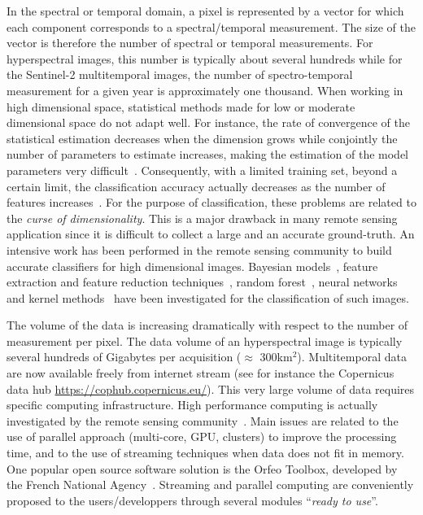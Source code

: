 \documentclass[journal,peerreview,onecolumn]{IEEEtran}
\begin{document}
In the spectral or temporal domain, a pixel is represented by a vector
for   which  each   component  corresponds   to  a   spectral/temporal
measurement.   The size  of  the  vector is  therefore  the number  of
spectral  or temporal  measurements.  For  hyperspectral images,  this
number is  typically about several  hundreds while for  the Sentinel-2
multitemporal images, the number of spectro-temporal measurement for a
given  year  is approximately  one  thousand.   When working  in  high
dimensional  space,  statistical  methods  made for  low  or  moderate
dimensional  space do  not  adapt  well.  For  instance,  the rate  of
convergence of the statistical estimation decreases when the dimension
grows while conjointly the number of parameters to estimate increases,
making    the    estimation    of   the    model    parameters    very
difficult~\cite{donoho}.  Consequently,  with a limited  training set,
beyond a certain limit, the classification accuracy actually decreases
as the number of features increases~\cite{hughes}.  For the purpose of
classification,  these  problems are  related  to  the \emph{curse  of
  dimensionality}. This  is a  major drawback  in many  remote sensing
application since it  is difficult to collect a large  and an accurate
ground-truth.   An intensive  work has  been performed  in the  remote
sensing community  to build accurate classifiers  for high dimensional
images.  Bayesian models~\cite{book:landgrebe}, feature extraction and
feature   reduction   techniques~\cite{book:landgrebe,DR:guided:tour},
random   forest~\cite{1396322},  neural   networks~\cite{5411821}  and
kernel methods~\cite{kernel:methods:rs} have been investigated for the
classification of such images.

The volume of the data is  increasing dramatically with respect to the
number of measurement  per pixel. The data volume  of an hyperspectral
image  is  typically several  hundreds  of  Gigabytes per  acquisition
($\approx$  300km$^2$). Multitemporal  data are  now available  freely
from  internet  stream  (see  for instance  the  Copernicus  data  hub
\url{https://cophub.copernicus.eu/}).  This very  large volume of data
requires   specific   computing  infrastructure.    High   performance
computing   is   actually   investigated   by   the   remote   sensing
community~\cite{christophe2011remote,plaza2011high}.  Main  issues are
related to the use of parallel approach (multi-core, GPU, clusters) to
improve the  processing time, and  to the use of  streaming techniques
when data  does not fit in  memory.  One popular open  source software
solution  is  the Orfeo  Toolbox,  developed  by the  French  National
Agency~\cite{christophe2008orfeo}.   Streaming and  parallel computing
are  conveniently proposed  to the  users/developpers through  several
modules ``\emph{ready to use}''.
\end{document}
